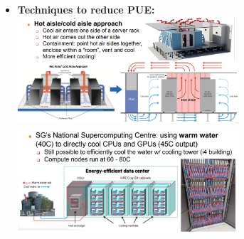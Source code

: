 \documentclass[10pt,landscape]{article}
\begin{document}
\begin{multicols*}{3}
\begin{itemize}[topsep=0pt,noitemsep,wide=0pt, leftmargin=\dimexpr{} + 2\relax]
\begin{itemize}[topsep=0pt,noitemsep,wide=0pt, leftmargin=\dimexpr{} + 2\relax]
\begin{itemize}[topsep=0pt,noitemsep,wide=0pt, leftmargin=\dimexpr{} + 2\relax]
        \end{itemize}
        \item \textbf{Techniques to reduce PUE:} \\ 
        \includegraphics*[width=8.2cm, height=4cm]{images/hotaisle.PNG} \\ 
        \includegraphics*[width=8.2cm, height=4cm]{images/warmwater.PNG}
    \end{itemize}
\end{itemize}


\end{multicols*}
\end{document}
